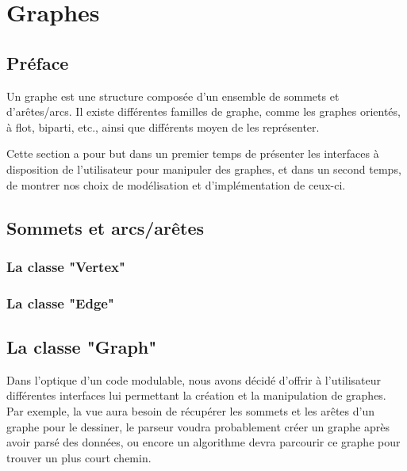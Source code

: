 \documentclass[french]{article}
\begin{document}
	\section{Graphes}
		\subsection{Préface}
		Un graphe est une structure composée d'un ensemble de sommets et d'arêtes/arcs. Il existe différentes familles de graphe, comme les graphes orientés, à flot, biparti, etc., ainsi que différents moyen de les représenter.
		
		Cette section a pour but dans un premier temps de présenter les interfaces à disposition de l'utilisateur pour manipuler des graphes, et dans un second temps, de montrer nos choix de modélisation et d'implémentation de ceux-ci.
		
		\subsection{Sommets et arcs/arêtes}
		
		
		\subsubsection{La classe "Vertex"}
		
		\subsubsection{La classe "Edge"}
		
		\subsection{La classe "Graph"}
		Dans l'optique d'un code modulable, nous avons décidé d'offrir à l'utilisateur différentes interfaces lui permettant la création et la manipulation de graphes. Par exemple, la vue aura besoin de récupérer les sommets et les arêtes d'un graphe pour le dessiner, le parseur voudra probablement créer un graphe après avoir parsé des données, ou encore un algorithme devra parcourir ce graphe pour trouver un plus court chemin.
		
\end{document}

